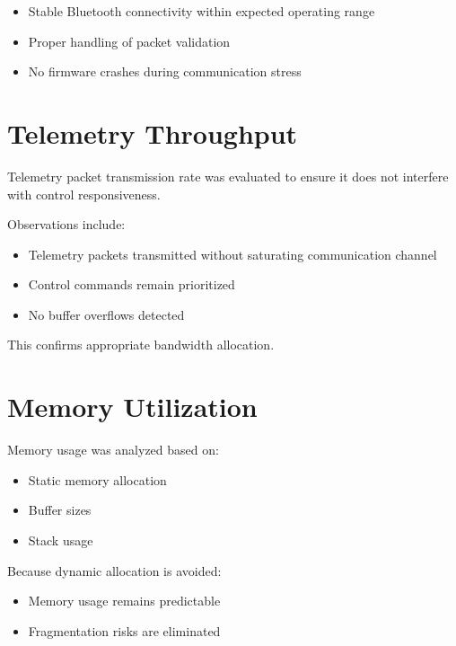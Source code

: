 \begin{itemize}
	\item Stable Bluetooth connectivity within expected operating range
	\item Proper handling of packet validation
	\item No firmware crashes during communication stress
\end{itemize}


\section{Telemetry Throughput}

Telemetry packet transmission rate was evaluated to ensure it does not interfere with control responsiveness.

Observations include:

\begin{itemize}
	\item Telemetry packets transmitted without saturating communication channel
	\item Control commands remain prioritized
	\item No buffer overflows detected
\end{itemize}

This confirms appropriate bandwidth allocation.


\section{Memory Utilization}

Memory usage was analyzed based on:

\begin{itemize}
	\item Static memory allocation
	\item Buffer sizes
	\item Stack usage
\end{itemize}

Because dynamic allocation is avoided:

\begin{itemize}
	\item Memory usage remains predictable
	\item Fragmentation risks are eliminated
\end{itemize}

